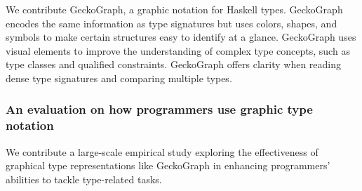 We contribute GeckoGraph, a graphic notation for Haskell types. GeckoGraph encodes the same information as type signatures but uses colors, shapes, and symbols to make certain structures easy to identify at a glance. GeckoGraph uses visual elements to improve the understanding of complex type concepts, such as type classes and qualified constraints. GeckoGraph offers clarity when reading dense type signatures and comparing multiple types.

\subsubsection{An evaluation on how programmers use graphic type notation}

We contribute a large-scale empirical study exploring the effectiveness of graphical type representations like GeckoGraph in enhancing programmers' abilities to tackle type-related tasks.







